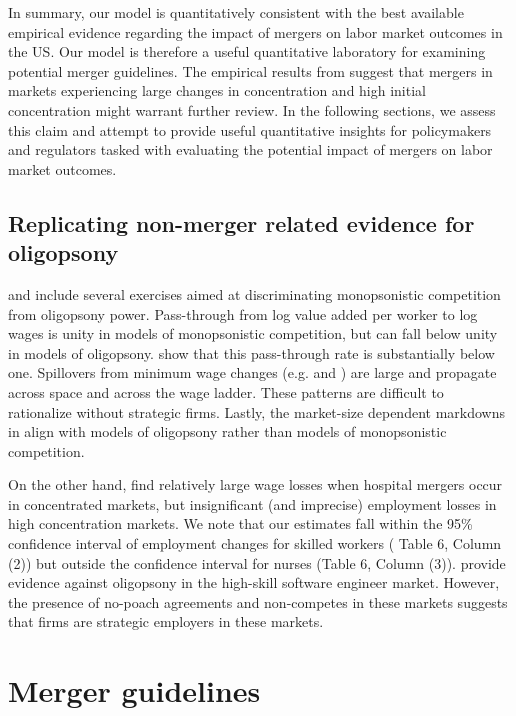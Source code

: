 \documentclass[12pt]{article}
\theoremstyle{prop}
\begin{document}
In summary, our model is quantitatively consistent with the best available empirical evidence regarding the impact of mergers on labor market outcomes in the US. 
Our model is therefore a useful quantitative laboratory for examining potential merger guidelines. 
The empirical results from \citet{Arnold} suggest that mergers in markets experiencing large changes in concentration and high initial concentration might warrant further review. 
In the following sections, we assess this claim and attempt to provide useful quantitative insights for policymakers and regulators tasked with evaluating the potential impact of mergers on labor market outcomes.

 
\subsection{Replicating non-merger related evidence for oligopsony}

\citet{berger2022labor} and \citet{berger2022minimum} include several exercises aimed at discriminating monopsonistic competition from oligopsony power. 
Pass-through from log value added per worker to log wages is unity in models of monopsonistic competition, but can fall below unity in models of oligopsony. 
\citet{klineQJE2018} show that this pass-through rate is substantially below one. 
Spillovers from minimum wage changes (e.g. \citet{staiger2010there} and \citet{engbom2022earnings}) are large and propagate across space and across the wage ladder. These patterns are difficult to rationalize without strategic firms. 
Lastly, the market-size dependent markdowns in \citet{yeh2022monopsony} align with models of oligopsony rather than models of monopsonistic competition. 

On the other hand, \citet{prager2021mergers} find relatively large wage losses when hospital mergers occur in concentrated markets, but insignificant (and imprecise) employment losses in high concentration markets. 
We note that our estimates fall within the 95\% confidence interval of employment changes for skilled workers (\citet{prager2021employer} Table 6, Column (2)) but outside the confidence interval for nurses (Table 6, Column (3)). \citet{roussille2023bidding} provide evidence against oligopsony in the high-skill software engineer market. 
However, the presence of no-poach agreements and non-competes in these markets \citep[e.g.][]{posner2023new} suggests that firms are strategic employers in these markets. 
 

\section{Merger guidelines}\label{sec:Guidelines}
\end{document}
